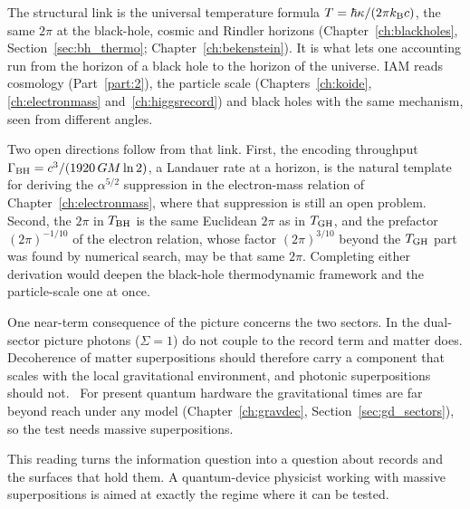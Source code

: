 The structural link is the universal temperature formula $T=\hbar\kappa/(2\pi k_{\mathrm B} c)$, the same $2\pi$ at the black-hole, cosmic and Rindler horizons
(Chapter~\ref{ch:blackholes}, Section~\ref{sec:bh_thermo}; Chapter~\ref{ch:bekenstein}). It is what lets one accounting run from the horizon of a black hole to the horizon of the universe.
IAM reads cosmology (Part~\ref{part:2}), the particle scale (Chapters~\ref{ch:koide}, \ref{ch:electronmass} and~\ref{ch:higgsrecord}) and black holes with the same mechanism, seen from different angles. \interp

Two open directions follow from that link. First, the encoding throughput $\Gamma_{\rm BH}=c^3/(1920\,GM\ln2)$, a Landauer rate at a horizon, is the natural template
for deriving the $\alpha^{5/2}$ suppression in the electron-mass relation of Chapter~\ref{ch:electronmass}, where that suppression is still an open problem. Second, the $2\pi$
in $T_{\rm BH}$ is the same Euclidean $2\pi$ as in $T_{\rm GH}$, and the prefactor $(2\pi)^{-1/10}$ of the electron relation, whose factor $(2\pi)^{3/10}$ beyond the $T_{\rm GH}$ part was found by numerical search, may be that same
$2\pi$. Completing either derivation would deepen the black-hole thermodynamic framework and the particle-scale one at once. \conjecture

One near-term consequence of the picture concerns the two sectors. In the dual-sector picture photons ($\Sigma=1$) do not couple to the record term and
matter does. Decoherence of matter superpositions should therefore carry a component that scales with the local gravitational environment, and photonic
superpositions should not. \conjecture\ For present quantum hardware the gravitational times are far beyond reach under any model (Chapter~\ref{ch:gravdec},
Section~\ref{sec:gd_sectors}), so the test needs massive superpositions.

This reading turns the information question into a question about records and the surfaces that hold them. A quantum-device physicist working with massive superpositions is aimed at exactly the regime where it can be tested.
